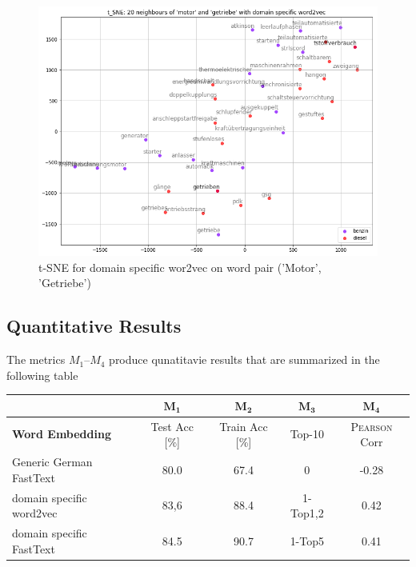\documentclass[10pt,a4paper]{article}
\begin{document}
\begin{figure}
	\begin{center}
		\includegraphics[scale=0.4]{./Pictures/model_ds_w2v_motor_getriebe.png}
		\caption{t-SNE for domain specific wor2vec on word pair ('Motor', 'Getriebe')}
	\end{center}	
\end{figure}

\subsection{Quantitative Results}
	The metrics \textbf{$M_1$}--\textbf{$M_4$} produce qunatitavie results that are summarized in the following table 
	
	\begin{center}
		\begin{tabular}{|l| c| c| c|c|}
			
			\hline
			
			 & $\boldsymbol{M_1}$ & $\boldsymbol{M_2}$ & $\boldsymbol{M_3}$ & $\boldsymbol{M_4}$\\ \hline
			
			\textbf{Word Embedding} & Test Acc [\%]& Train Acc [\%] & Top-10 & \textsc{Pearson} Corr \\ \hline
		    Generic German FastText   & 80.0 & 67.4 & 0 & -0.28\\  \hline
			
			domain specific word2vec  & 83,6 & 88.4 & 1-Top1,2 & 0.42\\  \hline
			
			domain specific FastText  & 84.5 & 90.7 & 1-Top5  & 0.41\\ \hline 
		
		\end{tabular}
	\end{center}
\end{document}
